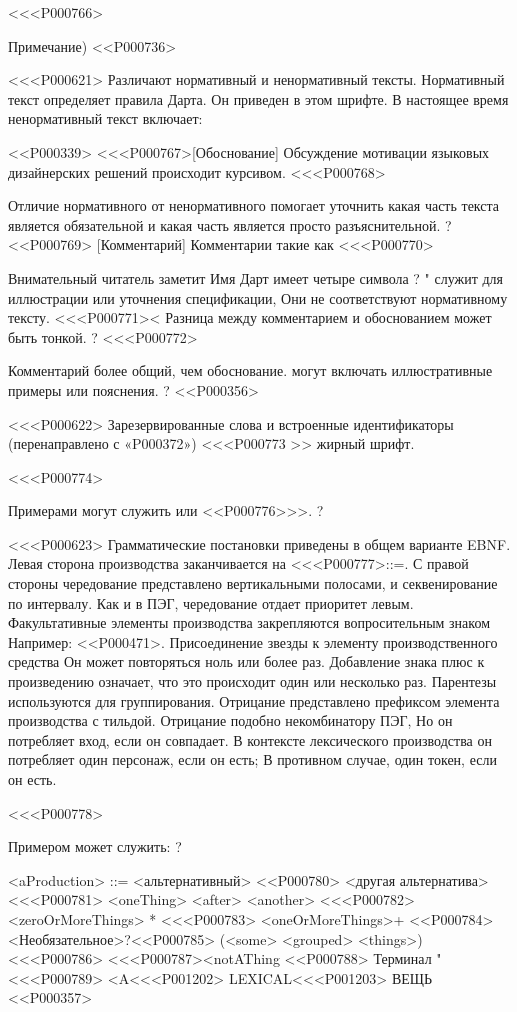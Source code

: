 <<<P000766>{Примечание)
<<P000736>

<<<P000621>%
Различают нормативный и ненормативный тексты.
Нормативный текст определяет правила Дарта.
Он приведен в этом шрифте.
В настоящее время ненормативный текст включает:

<<P000339>
<<<P000767>[Обоснование]
Обсуждение мотивации языковых дизайнерских решений происходит курсивом.
<<<P000768>{%
Отличие нормативного от ненормативного помогает уточнить
какая часть текста является обязательной и какая часть является просто разъяснительной.
?
<<P000769> [Комментарий]
Комментарии такие как
<<<P000770>{%
Внимательный читатель заметит
Имя Дарт имеет четыре символа %
? "
служит для иллюстрации или уточнения спецификации,
Они не соответствуют нормативному тексту.
<<<P000771><%
Разница между комментарием и обоснованием может быть тонкой.
?
<<<P000772>{%
Комментарий более общий, чем обоснование.
могут включать иллюстративные примеры или пояснения.%
?
<<P000356>

<<<P000622>%
Зарезервированные слова и встроенные идентификаторы
(перенаправлено с «P000372»)
{<<<P000773 >> жирный шрифт}.

<<<P000774>{%
Примерами могут служить \SWITCH{} или <<P000776>>>.%
?

<<<P000623>%
Грамматические постановки приведены в общем варианте EBNF.
Левая сторона производства заканчивается на <<<P000777>{::=}.
С правой стороны чередование представлено вертикальными полосами,
и секвенирование по интервалу.
Как и в ПЭГ, чередование отдает приоритет левым.
Факультативные элементы производства закрепляются вопросительным знаком
Например: <<P000471>.
Присоединение звезды к элементу производственного средства
Он может повторяться ноль или более раз.
Добавление знака плюс к произведению означает, что это происходит один или несколько раз.
Парентезы используются для группирования.
Отрицание представлено префиксом элемента производства с тильдой.
Отрицание подобно некомбинатору ПЭГ,
Но он потребляет вход, если он совпадает.
В контексте лексического производства он потребляет
один персонаж, если он есть;
В противном случае, один токен, если он есть.

<<<P000778>{%
Примером может служить:%
?

\begin{grammar}\color{комментарийЦвет}
<aProduction> ::= <альтернативный>
<<P000780> <другая альтернатива>
<<<P000781> <oneThing> <after> <another>
<<<P000782> <zeroOrMoreThings> *
<<<P000783> <oneOrMoreThings>+
<<P000784> <Необязательное>?<<P000785> (<some> <grouped> <things>)
<<<P000786> <<<P000787><notAThing
<<P000788> Терминал "
<<<P000789> <A<<<P001202> LEXICAL<<<P001203> ВЕЩЬ
<<P000357>


\end{grammar}}}}}}}
